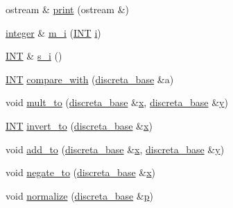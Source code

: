 \begin{DoxyCompactItemize}
\item 
ostream \& \mbox{\hyperlink{classinteger_a8aef91d98e8edc8d895c1d6cfc35677b}{print}} (ostream \&)
\item 
\mbox{\hyperlink{classinteger}{integer}} \& \mbox{\hyperlink{classinteger_a869091f0a0f35f5354c8c4a70250e8a9}{m\+\_\+i}} (\mbox{\hyperlink{galois_8h_a09fddde158a3a20bd2dcadb609de11dc}{I\+NT}} \mbox{\hyperlink{alphabet2_8_c_acb559820d9ca11295b4500f179ef6392}{i}})
\item 
\mbox{\hyperlink{galois_8h_a09fddde158a3a20bd2dcadb609de11dc}{I\+NT}} \& \mbox{\hyperlink{classinteger_adf28e9f94d4c844adaa950deeb80b904}{s\+\_\+i}} ()
\item 
\mbox{\hyperlink{galois_8h_a09fddde158a3a20bd2dcadb609de11dc}{I\+NT}} \mbox{\hyperlink{classinteger_a20cc8d8d4913e9ee746c6758bbb2e62a}{compare\+\_\+with}} (\mbox{\hyperlink{classdiscreta__base}{discreta\+\_\+base}} \&a)
\item 
void \mbox{\hyperlink{classinteger_a7f4f072c0d9c6b15660d80e81496dffc}{mult\+\_\+to}} (\mbox{\hyperlink{classdiscreta__base}{discreta\+\_\+base}} \&\mbox{\hyperlink{alphabet2_8_c_a6150e0515f7202e2fb518f7206ed97dc}{x}}, \mbox{\hyperlink{classdiscreta__base}{discreta\+\_\+base}} \&\mbox{\hyperlink{alphabet2_8_c_a0a2f84ed7838f07779ae24c5a9086d33}{y}})
\item 
\mbox{\hyperlink{galois_8h_a09fddde158a3a20bd2dcadb609de11dc}{I\+NT}} \mbox{\hyperlink{classinteger_a9a991b285677b99b4879034e31648b7a}{invert\+\_\+to}} (\mbox{\hyperlink{classdiscreta__base}{discreta\+\_\+base}} \&\mbox{\hyperlink{alphabet2_8_c_a6150e0515f7202e2fb518f7206ed97dc}{x}})
\item 
void \mbox{\hyperlink{classinteger_a3f6fe19fe4f2948364b1e75a6dfec47f}{add\+\_\+to}} (\mbox{\hyperlink{classdiscreta__base}{discreta\+\_\+base}} \&\mbox{\hyperlink{alphabet2_8_c_a6150e0515f7202e2fb518f7206ed97dc}{x}}, \mbox{\hyperlink{classdiscreta__base}{discreta\+\_\+base}} \&\mbox{\hyperlink{alphabet2_8_c_a0a2f84ed7838f07779ae24c5a9086d33}{y}})
\item 
void \mbox{\hyperlink{classinteger_a1da2bd683bdef336057ef2b84d4b3978}{negate\+\_\+to}} (\mbox{\hyperlink{classdiscreta__base}{discreta\+\_\+base}} \&\mbox{\hyperlink{alphabet2_8_c_a6150e0515f7202e2fb518f7206ed97dc}{x}})
\item 
void \mbox{\hyperlink{classinteger_aac4272bbf32a3e1b4a5201630f116388}{normalize}} (\mbox{\hyperlink{classdiscreta__base}{discreta\+\_\+base}} \&\mbox{\hyperlink{alphabet2_8_c_a533391314665d6bf1b5575e9a9cd8552}{p}})
\item 

\end{DoxyCompactItemize}
